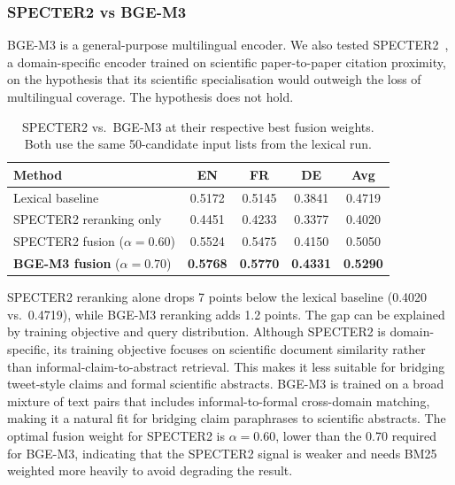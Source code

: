 \subsubsection{SPECTER2 vs BGE-M3}

BGE-M3 is a general-purpose multilingual encoder. We also tested SPECTER2~\cite{singh2022scirepeval}, a domain-specific encoder trained on scientific paper-to-paper citation proximity, on the hypothesis that its scientific specialisation would outweigh the loss of multilingual coverage. The hypothesis does not hold.

\begin{table}[!ht]
    \caption{SPECTER2 vs.\ BGE-M3 at their respective best fusion weights. Both use the same 50-candidate input lists from the lexical run.}
    \label{tab:specter-vs-bge}
    \centering
    \begin{tabular}{lcccc}
        \toprule
        Method & EN & FR & DE & Avg \\
        \midrule
        Lexical baseline                           & 0.5172 & 0.5145 & 0.3841 & 0.4719 \\
        SPECTER2 reranking only                    & 0.4451 & 0.4233 & 0.3377 & 0.4020 \\
        SPECTER2 fusion ($\alpha{=}0.60$)          & 0.5524 & 0.5475 & 0.4150 & 0.5050 \\
        \textbf{BGE-M3 fusion} ($\alpha{=}0.70$)   & \textbf{0.5768} & \textbf{0.5770} & \textbf{0.4331} & \textbf{0.5290} \\
        \bottomrule
    \end{tabular}
\end{table}

SPECTER2 reranking alone drops 7 points below the lexical baseline (0.4020 vs.\ 0.4719), while BGE-M3 reranking adds 1.2 points. The gap can be explained by training objective and query distribution. Although SPECTER2 is domain-specific, its training objective focuses on scientific document similarity rather than informal-claim-to-abstract retrieval. This makes it less suitable for bridging tweet-style claims and formal scientific abstracts. BGE-M3 is trained on a broad mixture of text pairs that includes informal-to-formal cross-domain matching, making it a natural fit for bridging claim paraphrases to scientific abstracts. The optimal fusion weight for SPECTER2 is $\alpha{=}0.60$, lower than the 0.70 required for BGE-M3, indicating that the SPECTER2 signal is weaker and needs BM25 weighted more heavily to avoid degrading the result.

